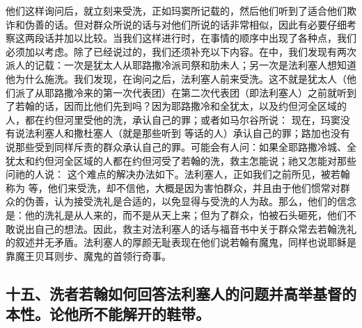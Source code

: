 他们这样询问后，就立刻来受洗，正如玛窦所记载的，然后他们听到了适合他们欺诈和伪善的话。但对群众所说的话与对他们所说的话非常相似，因此有必要仔细考察这两段话并加以比较。当我们这样进行时，在事情的顺序中出现了各种点，我们必须加以考虑。除了已经说过的，我们还须补充以下内容。在中，我们发现有两次派人的记载：一次是犹太人从耶路撒冷派司祭和肋未人；另一次是法利塞人想知道他为什么施洗。我们发现，在询问之后，法利塞人前来受洗。这不就是犹太人（他们派了从耶路撒冷来的第一次代表团）在第二次代表团（即法利塞人）之前就听到了若翰的话，因而比他们先到吗？因为耶路撒冷和全犹太，以及约但河全区域的人，都在约但河里受他的洗，承认自己的罪；或者如马尔谷所说： 现在，玛窦没有说法利塞人和撒杜塞人（就是那些听到  等话的人）承认自己的罪；路加也没有说那些受到同样斥责的群众承认自己的罪。可能会有人问：如果全耶路撒冷城、全犹太和约但河全区域的人都在约但河受了若翰的洗，救主怎能说；祂又怎能对那些问祂的人说： 这个难点的解决办法如下。法利塞人，正如我们之前所见，被若翰称为  等，他们来受洗，却不信他，大概是因为害怕群众，并且由于他们惯常对群众的伪善，认为接受洗礼是合适的，以免显得与受洗的人为敌。那么，他们的信念是：他的洗礼是从人来的，而不是从天上来；但为了群众，怕被石头砸死，他们不敢说出自己的想法。因此，救主对法利塞人的话与福音书中关于群众常去若翰洗礼的叙述并无矛盾。法利塞人的厚颜无耻表现在他们说若翰有魔鬼，同样也说耶稣是靠魔王贝耳则步、魔鬼的首领行奇事。\par


\subsection{十五、洗者若翰如何回答法利塞人的问题并高举基督的本性。论他所不能解开的鞋带。}

